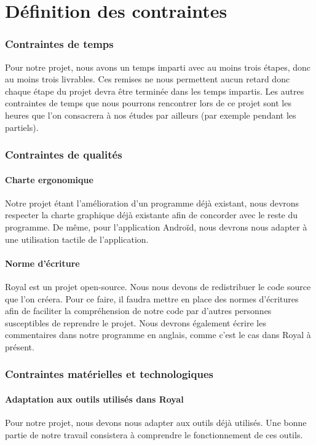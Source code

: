 \part{Définition des contraintes}


\section{Contraintes de temps}
Pour notre projet, nous avons un temps imparti avec au moins trois étapes, donc au moins trois livrables. Ces remises ne nous permettent aucun retard donc chaque étape du projet devra être terminée dans les temps impartis.
Les autres contraintes de temps que nous pourrons rencontrer lors de ce projet sont les heures que l'on consacrera à nos études par ailleurs (par exemple pendant les partiels). 

\section{Contraintes de qualités}

\subsection{Charte ergonomique}
Notre projet étant l'amélioration d'un programme déjà existant, nous devrons respecter la charte graphique déjà existante afin de concorder avec le reste du programme. 
De même, pour l'application Androïd, nous devrons nous adapter à une utilisation tactile de l'application. 

\subsection{Norme d'écriture}
Royal est un projet open-source. 
Nous nous devons de redistribuer le code source que l'on créera.
Pour ce faire, il faudra mettre en place des normes d'écritures afin de faciliter la compréhension de notre code par d'autres personnes susceptibles de reprendre le projet. 
Nous devrons également écrire les commentaires dans notre programme en anglais, comme c'est le cas dans Royal à présent.

\section{Contraintes matérielles et technologiques}

\subsection{Adaptation aux outils utilisés dans Royal}
Pour notre projet, nous devons nous adapter aux outils déjà utilisés. Une bonne partie de notre travail consistera à comprendre le fonctionnement de ces outils.

